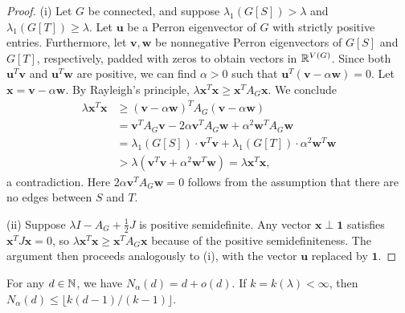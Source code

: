 \begin{proof}
    (i) Let $G$ be connected, and suppose $\lambda_1(G[S]) > \lambda$ and $\lambda_1(G[T]) \ge \lambda$.
    Let $\bm{u}$ be a Perron eigenvector of $G$ with strictly positive entries.
    Furthermore, let $\bm{v}, \bm{w}$ be nonnegative Perron eigenvectors of $G[S]$ and $G[T]$, respectively, padded with zeros to obtain vectors in $\mathbb{R}^{V(G)}$.
    Since both $\bm{u}^T \bm{v}$ and $\bm{u}^T \bm{w}$ are positive, we can find $\alpha > 0$ such that 
    $\bm{u}^T (\bm{v} - \alpha \bm{w}) = 0$.
    Let $\bm{x} = \bm{v} - \alpha \bm{w}$.
    By Rayleigh's principle, $\lambda \bm{x}^T \bm{x} \ge \bm{x}^T A_G \bm{x}$. 
    We conclude
    \begin{align*}
        \lambda \bm{x}^T \bm{x} &\ge (\bm{v} - \alpha \bm{w})^T A_G (\bm{v} - \alpha \bm{w}) \\
            &= \bm{v}^T A_G \bm{v} - 2 \alpha \bm{v}^T A_G \bm{w} + \alpha^2 \bm{w}^T A_G \bm{w}  \\
            &= \lambda_1(G[S]) \cdot \bm{v}^T \bm{v} + \lambda_1(G[T]) \cdot \alpha^2 \bm{w}^T \bm{w} \\
            &> \lambda (\bm{v}^T \bm{v} + \alpha^2 \bm{w}^T \bm{w}) = \lambda \bm{x}^T \bm{x},
    \end{align*}
    a contradiction. 
    Here $2 \alpha \bm{v}^T A_G \bm{w} = 0$ follows from the assumption that there are no edges between $S$ and $T$.
        
    (ii) Suppose $\lambda I - A_G + \frac{1}{2}J$ is positive semidefinite.
    Any vector $\bm{x} \perp \bm{1}$ satisfies $\bm{x}^T J \bm{x} = 0$,
    so $\lambda \bm{x}^T \bm{x} \ge \bm{x}^T A _G\bm{x}$ because of the positive semidefiniteness.
    The argument then proceeds analogously to (i), with the vector $\bm{u}$ replaced by $\bm{1}$.
\end{proof}

\begin{proposition} \label{prop:equiangular-lines-upper-bounds}
    For any $d \in \mathbb{N}$, we have $N_\alpha(d) = d + o(d)$. 
    If $k = k(\lambda) < \infty$, then $N_\alpha(d) \le \lfloor k(d- 1) / (k - 1) \rfloor$.
\end{proposition}

